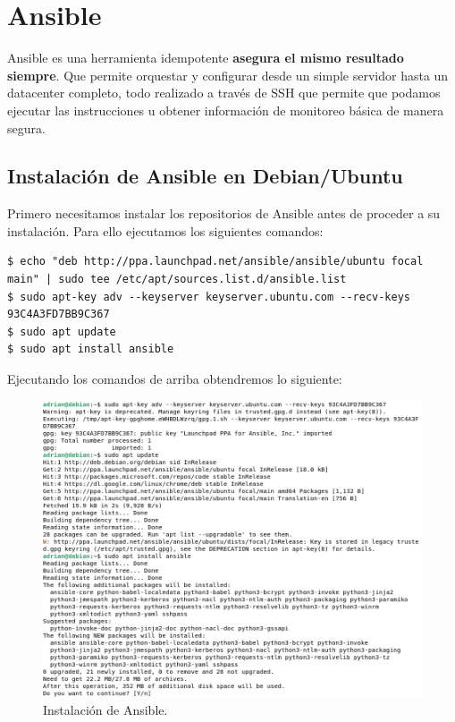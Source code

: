 \newpage
\section{Ansible}

Ansible es una herramienta idempotente \textbf{asegura el mismo resultado siempre}. Que permite orquestar y configurar desde un simple servidor hasta un datacenter completo, todo realizado a través de SSH que permite que podamos ejecutar las instrucciones
u obtener información de monitoreo básica de manera segura.

\subsection{Instalación de Ansible en Debian/Ubuntu}

Primero necesitamos instalar los repositorios de Ansible antes de proceder a su instalación. Para ello ejecutamos los siguientes comandos:
\begin{lstlisting}[style=mybash]
$ echo "deb http://ppa.launchpad.net/ansible/ansible/ubuntu focal main" | sudo tee /etc/apt/sources.list.d/ansible.list
$ sudo apt-key adv --keyserver keyserver.ubuntu.com --recv-keys 93C4A3FD7BB9C367
$ sudo apt update
$ sudo apt install ansible
\end{lstlisting}

Ejecutando los comandos de arriba obtendremos lo siguiente:

\begin{figure}[H]
	\centering
	\includegraphics[scale=0.35]{img/ansible0}
	\caption{Instalación de Ansible.}
\end{figure}

